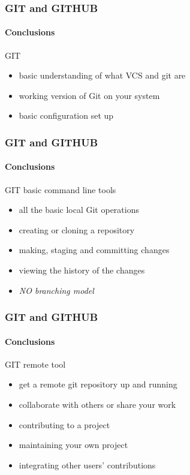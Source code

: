 \begin{frame}
 	\frametitle{GIT and GITHUB}
 	\framesubtitle{Conclusions}
 	\addtocounter{nframe}{1}

 	\begin{block}{GIT}
 		\begin{itemize}
 			\item basic understanding of what VCS and git are
 			\item working version of Git on your system
 			\item basic configuration set up
 		\end{itemize}
 	\end{block}
\end{frame}

\begin{frame}
	\frametitle{GIT and GITHUB}
	\framesubtitle{Conclusions}
	\addtocounter{nframe}{1}

	\begin{block}{GIT basic command line tools}
		\begin{itemize}
			\item all the basic local Git operations
			\item creating or cloning a repository
			\item making, staging and committing changes
			\item viewing the history of the changes 
			\item \emph{NO branching model}
		\end{itemize}
	\end{block}
\end{frame}

\begin{frame}
	\frametitle{GIT and GITHUB}
	\framesubtitle{Conclusions}
	\addtocounter{nframe}{1}

	\begin{block}{GIT remote tool}
		\begin{itemize}
			\item get a remote git repository up and running 
			\item collaborate with others or share your work
			\item contributing to a project 
			\item maintaining your own project 
			\item integrating other users' contributions
		\end{itemize}
	\end{block}
\end{frame}

